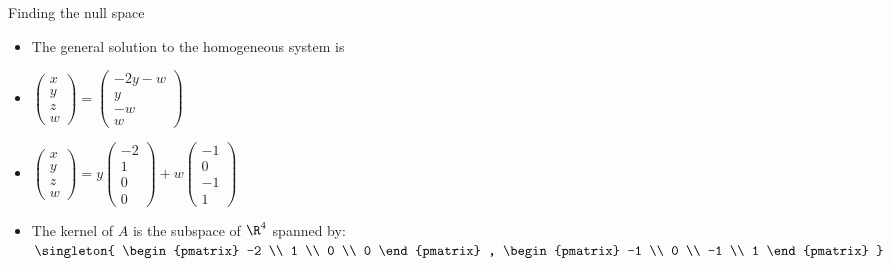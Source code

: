 \documentclass{beamer}
\begin{document}
\begin{frame}{Finding the null space}

\begin{itemize}
\item The general solution to the homogeneous system is
\item
$
\begin{pmatrix}
x \\ y \\ z \\ w
\end{pmatrix}
=
\begin{pmatrix}
-2y - w \\
y \\
-w \\
w
\end{pmatrix}
$
\item
$
\begin{pmatrix}
x \\ y \\ z \\ w
\end{pmatrix}
=
y
\begin{pmatrix}
-2 \\
1 \\
0 \\
0
\end{pmatrix}
+
w
\begin{pmatrix}
-1 \\
0 \\
-1 \\
1
\end{pmatrix}
$
\item The kernel of $A$ is the subspace of $\R^4$ spanned by:
$
\singleton{
\begin{pmatrix}
-2 \\
1 \\
0 \\
0
\end{pmatrix}
,
\begin{pmatrix}
-1 \\
0 \\
-1 \\
1
\end{pmatrix}
}
$
\end{itemize}
\end{frame}
\end{document}
